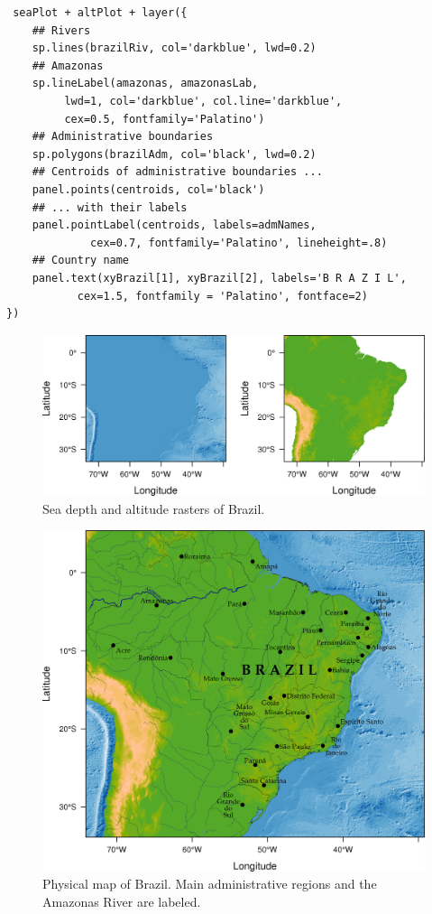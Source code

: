 \documentclass[smallroyalvopaper]{memoir}
\begin{document}
\begin{enumerate}

\lstset{language=R,numbers=none}
\begin{lstlisting}
 seaPlot + altPlot + layer({
    ## Rivers
    sp.lines(brazilRiv, col='darkblue', lwd=0.2)
    ## Amazonas
    sp.lineLabel(amazonas, amazonasLab, 
		 lwd=1, col='darkblue', col.line='darkblue',
		 cex=0.5, fontfamily='Palatino')
    ## Administrative boundaries
    sp.polygons(brazilAdm, col='black', lwd=0.2)
    ## Centroids of administrative boundaries ...
    panel.points(centroids, col='black')
    ## ... with their labels
    panel.pointLabel(centroids, labels=admNames,
		     cex=0.7, fontfamily='Palatino', lineheight=.8)
    ## Country name
    panel.text(xyBrazil[1], xyBrazil[2], labels='B R A Z I L',
	       cex=1.5, fontfamily = 'Palatino', fontface=2)
})
\end{lstlisting}
\end{enumerate}

\begin{figure}[htb]
\centering
\includegraphics[width=.9\linewidth]{figs/rastersBrazil.png}
\caption{\label{fig:rastersBrazil}Sea depth and altitude rasters of Brazil.}
\end{figure}


\begin{figure}[htb]
\centering
\includegraphics[width=.9\linewidth]{figs/brazil.png}
\caption{\label{fig:brazil}Physical map of Brazil. Main administrative regions and the Amazonas River are labeled.}
\end{figure}
\end{document}
